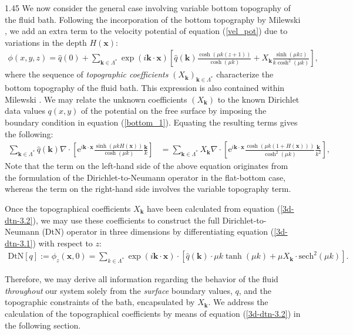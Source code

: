 \documentclass[12pt,titlepage]{article}
\theoremstyle{definition}
\theoremstyle{remark}
\newcommand{\M}[1]{\mathbf{#1}}
\begin{document}
\begin{spacing}{1.45}
We now consider the general case involving variable bottom topography of the fluid bath. Following the incorporation of the bottom topography by Milewski \cite{milewski1998formulation}, we add an extra term to the velocity potential of equation (\ref{vel_pot}) due to variations in the depth $H(\M{x})$:
\begin{align}
\label{3d-dtn-3.1}
      \phi(x, y, z) = \hat{q}(0) + \sum_{\M{k} \in \Lambda^*} \exp(i \M{k} \cdot \M{x}) \left[ \hat{q}(\M{k}) \frac{\cosh(\mu k (z + 1) )}{\cosh(\mu k)} + X_{\M{k}} \frac{\sinh(\mu kz)}{k \cosh^2(\mu k)} \right],
\end{align}
where the sequence of \textit{topographic coefficients} $(X_{\M{k}})_{\M{k} \in \Lambda^*}$ characterize the bottom topography of the fluid bath. This expression is also contained within Milewski \cite{milewski1998formulation}. We may relate the unknown coefficients $(X_{\M{k}})$ to the known Dirichlet data values $q(x, y)$ of the potential on the free surface by imposing the boundary condition in equation (\ref{bottom_1}). Equating the resulting terms gives the following:
\begin{align}
\label{3d-dtn-3.2}
    \sum_{\M{k} \in \Lambda^*} \hat{q}(\M{k}) \nabla \cdot \left[ \mathrm{e}^{i \M{k} \cdot \M{x}}  \frac{\sinh(\mu k H(\M{x}) )}{\cosh(\mu k)} \frac{\M{k}}{k} \right] &= \sum_{\M{k} \in \Lambda^*} X_{\M{k}} \nabla \cdot \left[ \mathrm{e}^{i \M{k} \cdot \M{x}} \frac{\cosh(\mu k (1 + H(\M{x}) ))}{\cosh^2(\mu k)} \frac{\M{k}}{k^2} \right],
\end{align}
Note that the term on the left-hand side of the above equation originates from the formulation of the Dirichlet-to-Neumann operator in the flat-bottom case, whereas the term on the right-hand side involves the variable topography term.

Once the topographical coefficients $X_{\M{k}}$ have been calculated from equation (\ref{3d-dtn-3.2}), we may use these coefficients to construct the full Dirichlet-to-Neumann (DtN) operator in three dimensions by differentiating equation (\ref{3d-dtn-3.1}) with respect to $z$:
\begin{align}
\label{3d-dtn-3.3}
     \text{DtN}[q] := \phi_z(\M{x}, 0) = \sum_{k \in \Lambda^*} \exp(i \M{k} \cdot \M{x}) \cdot  \left[ \hat{q}(\M{k}) \cdot \mu k \tanh(\mu k) + \mu X_{\M{k}}  \cdot \text{sech}^2(\mu k) \right].
\end{align}

Therefore, we may derive all information regarding the behavior of the fluid \textit{throughout} our system solely from the \textit{surface} boundary values, $q$, and the topographic constraints of the bath, encapsulated by $X_{\M{k}}$. We address the calculation of the topographical coefficients by means of equation (\ref{3d-dtn-3.2}) in the following section.


\end{spacing}
\end{document}
